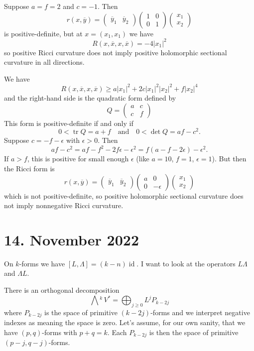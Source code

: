 \documentclass[11pt]{article}
\theoremstyle{definition}
\def\qandq{\quad\text{and}\quad}
\def\ov#1{\overline{#1}}
\DeclareMathOperator{\id}{id}
\DeclareMathOperator{\tr}{tr}
\newcommand{\ext}[1]{\bigwedge{}^{\!\!#1}\,}
\begin{document}
Suppose $a = f = 2$ and $c = -1$. Then
$$
r(x, \ov y) =
\begin{pmatrix}\ov y_1 & \ov y_2 \end{pmatrix}
\begin{pmatrix}
1 & 0 \\ 0 & 1
\end{pmatrix}
\begin{pmatrix} x_1 \\ x_2 \end{pmatrix}
$$
is positive-definite, but at $x = (x_1, x_1)$ we have
$$
R(x, \ov x, x, \ov x) = -4 |x_1|^2
$$
so positive Ricci curvature does not imply positive holomorphic sectional
curvature in all directions.

We have
$$
R(x, \ov x, x, \ov x)
\geq
a |x_1|^2 + 2c |x_1|^2 |x_2|^2 + f |x_2|^4
$$
and the right-hand side is the quadratic form defined by
$$
Q = \begin{pmatrix}
a & c \\ c & f
\end{pmatrix}
$$
This form is positive-definite if and only if
$$
0 < \tr Q = a + f
\qandq
0 < \det Q = af - c^2.
$$
Suppose $c = -f - \epsilon$ with $\epsilon > 0$.
Then
$$
af - c^2
= af - f^2 - 2f \epsilon - \epsilon^2
= f(a - f - 2\epsilon) - \epsilon^2.
$$
If $a > f$, this is positive for small enough $\epsilon$ (like $a = 10$, $f =
1$, $\epsilon = 1$).
But then the Ricci form is
$$
r(x, \ov y) =
\begin{pmatrix}\ov y_1 & \ov y_2 \end{pmatrix}
\begin{pmatrix}
a & 0 \\ 0 & -\epsilon
\end{pmatrix}
\begin{pmatrix} x_1 \\ x_2 \end{pmatrix}
$$
which is not positive-definite,
so positive holomorphic sectional curvature does not imply nonnegative Ricci
curvature.

\section{14. November 2022}

On $k$-forms we have $[L,\Lambda] = (k-n)\id$.
I want to look at the operators $L\Lambda$ and $\Lambda L$.

There is an orthogonal decomposition
$$
\ext{k}V^* = \bigoplus_{j \geq 0} L^{j} P_{k-2j}
$$
where $P_{k-2j}$ is the space of primitive $(k-2j)$-forms and we interpret
negative indexes as meaning the space is zero.
Let's assume, for our own sanity, that we have $(p,q)$-forms with $p+q = k$.
Each $P_{k-2j}$ is then the space of primitive $(p-j,q-j)$-forms.
\end{document}
